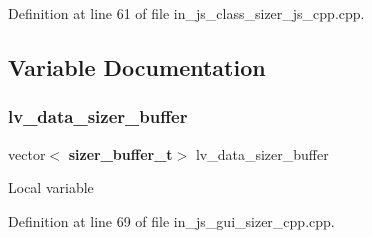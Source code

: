 Definition at line 61 of file in\+\_\+js\+\_\+class\+\_\+sizer\+\_\+js\+\_\+cpp.\+cpp.



\subsection{Variable Documentation}
\mbox{\label{group___sizer_ga8a33453947d24f7c6aa48f7b41c6a4bc}} 
\subsubsection{lv\_data\_sizer\_buffer}
{\footnotesize\ttfamily vector$<$\textbf{ sizer\+\_\+buffer\+\_\+t}$>$ lv\+\_\+data\+\_\+sizer\+\_\+buffer}

Local variable 

Definition at line 69 of file in\+\_\+js\+\_\+gui\+\_\+sizer\+\_\+cpp.\+cpp.

